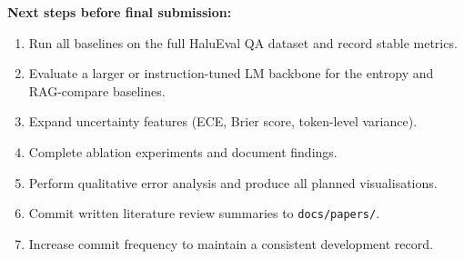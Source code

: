 \documentclass[12pt,a4paper]{article}
\begin{document}
\textbf{Next steps before final submission:}
\begin{enumerate}
  \item Run all baselines on the full HaluEval QA dataset and record stable metrics.
  \item Evaluate a larger or instruction-tuned LM backbone for the entropy and RAG-compare baselines.
  \item Expand uncertainty features (ECE, Brier score, token-level variance).
  \item Complete ablation experiments and document findings.
  \item Perform qualitative error analysis and produce all planned visualisations.
  \item Commit written literature review summaries to \texttt{docs/papers/}.
  \item Increase commit frequency to maintain a consistent development record.
\end{enumerate}

\newpage
\newpage
\end{document}
